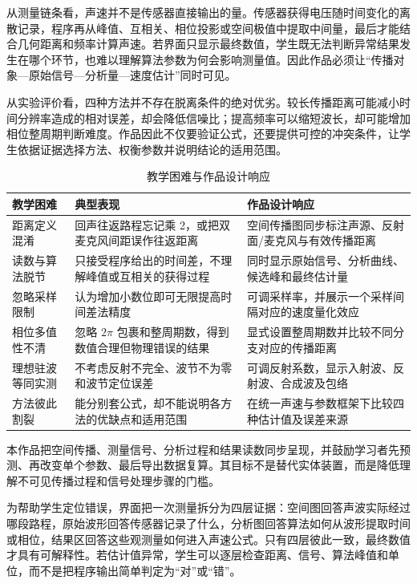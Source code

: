 \documentclass[UTF8,a4paper,zihao=-4]{ctexart}
\begin{document}
从测量链条看，声速并不是传感器直接输出的量。传感器获得电压随时间变化的离散记录，程序再从峰值、互相关、相位投影或空间极值中提取中间量，最后才能结合几何距离和频率计算声速。若界面只显示最终数值，学生既无法判断异常结果发生在哪个环节，也难以理解算法参数为何会影响测量值。因此作品必须让“传播对象—原始信号—分析量—速度估计”同时可见。

从实验评价看，四种方法并不存在脱离条件的绝对优劣。较长传播距离可能减小时间分辨率造成的相对误差，却会降低信噪比；提高频率可以缩短波长，却可能增加相位整周期判断难度。作品因此不仅要验证公式，还要提供可控的冲突条件，让学生依据证据选择方法、权衡参数并说明结论的适用范围。

\begin{table}[!htb]
\centering
\caption{教学困难与作品设计响应}
\label{tab:sound-problems}
\begin{tabularx}{\textwidth}{p{3.2cm}X X}
\toprule
教学困难 & 典型表现 & 作品设计响应\\
\midrule
距离定义混淆 & 回声往返路程忘记乘 2，或把双麦克风间距误作往返距离 & 空间传播图同步标注声源、反射面/麦克风与有效传播距离\\
读数与算法脱节 & 只接受程序给出的时间差，不理解峰值或互相关的获得过程 & 同时显示原始信号、分析曲线、候选峰和最终估计量\\
忽略采样限制 & 认为增加小数位即可无限提高时间差法精度 & 可调采样率，并展示一个采样间隔对应的速度量化效应\\
相位多值性不清 & 忽略 $2\pi$ 包裹和整周期数，得到数值合理但物理错误的结果 & 显式设置整周期数并比较不同分支对应的传播距离\\
理想驻波等同实测 & 不考虑反射不完全、波节不为零和波节定位误差 & 可调反射系数，显示入射波、反射波、合成波及包络\\
方法彼此割裂 & 能分别套公式，却不能说明各方法的优缺点和适用范围 & 在统一声速与参数框架下比较四种估计值及误差来源\\
\bottomrule
\end{tabularx}
\end{table}

本作品把空间传播、测量信号、分析过程和结果读数同步呈现，并鼓励学习者先预测、再改变单个参数、最后导出数据复算。其目标不是替代实体装置，而是降低理解不可见传播过程和信号处理步骤的门槛。

为帮助学生定位错误，界面把一次测量拆分为四层证据：空间图回答声波实际经过哪段路程，原始波形回答传感器记录了什么，分析图回答算法如何从波形提取时间或相位，结果区回答这些观测量如何进入声速公式。只有四层彼此一致，最终数值才具有可解释性。若估计值异常，学生可以逐层检查距离、信号、算法峰值和单位，而不是把程序输出简单判定为“对”或“错”。
\end{document}
